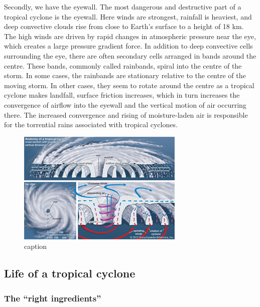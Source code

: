 \documentclass[12pt,oneside]{book}
\begin{document}
Secondly, we have the eyewall. The most dangerous and destructive part
of a tropical cyclone is the eyewall. Here winds are strongest, rainfall
is heaviest, and deep convective clouds rise from close to Earth's
surface to a height of 18 km. The high winds are driven by rapid changes
in atmospheric pressure near the eye, which creates a large pressure
gradient force. In addition to deep convective cells surrounding the
eye, there are often secondary cells arranged in bands around the
centre. These bands, commonly called rainbands, spiral into the centre
of the storm. In some cases, the rainbands are stationary relative to
the centre of the moving storm. In other cases, they seem to rotate
around the centre as a tropical cyclone makes landfall, surface friction
increases, which in turn increases the convergence of airflow into the
eyewall and the vertical motion of air occurring there. The increased
convergence and rising of moisture-laden air is responsible for the
torrential rains associated with tropical cyclones.

\begin{figure}

{\centering \includegraphics[width=0.8\linewidth]{figures/FigureE12} 

}

\caption{caption}\label{fig:Anatomycyclone}
\end{figure}

\subsection{Life of a tropical
cyclone}\label{life-of-a-tropical-cyclone}

\subsubsection{\texorpdfstring{The ``right
ingredients''}{The right ingredients}}\label{the-right-ingredients}
\end{document}

